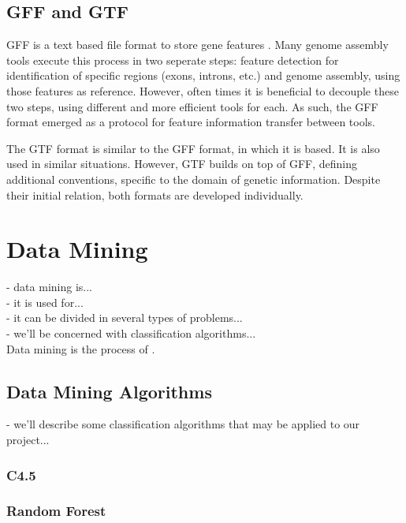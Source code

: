 \subsection{GFF and GTF}

GFF is a text based file format to store gene features \cite{sanger11}. Many
genome assembly tools execute this process in two seperate steps: feature
detection for identification of specific regions (exons, introns, etc.) and
genome assembly, using those features as reference. However, often times it is
beneficial to decouple these two steps, using different and more efficient tools
for each. As such, the GFF format emerged as a protocol for feature information
transfer between tools.

The GTF format is similar to the GFF format, in which it is based. It is also
used in similar situations. However, GTF builds on top of GFF, defining
additional conventions, specific to the domain of genetic information. Despite
their initial relation, both formats are developed individually.

\section{Data Mining}\label{sec:mlearning}

- data mining is...\\
- it is used for...\\
- it can be divided in several types of problems...\\
- we'll be concerned with classification algorithms...\\

Data mining is the process of  \cite[p. 5]{han2006data}.

\subsection{Data Mining Algorithms}\label{sec:minalgo}

- we'll describe some classification algorithms that may be applied to our
  project...\\

\subsubsection{C4.5}

\subsubsection{Random Forest}

